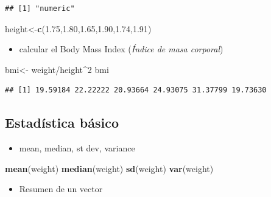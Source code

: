 \documentclass[]{article}
\def\tightlist{}
\newenvironment{Shaded}{\begin{snugshade}}{\end{snugshade}}
\newcommand{\KeywordTok}[1]{\textcolor[rgb]{0.13,0.29,0.53}{\textbf{{#1}}}}
\newcommand{\DecValTok}[1]{\textcolor[rgb]{0.00,0.00,0.81}{{#1}}}
\newcommand{\FloatTok}[1]{\textcolor[rgb]{0.00,0.00,0.81}{{#1}}}
\newcommand{\StringTok}[1]{\textcolor[rgb]{0.31,0.60,0.02}{{#1}}}
\newcommand{\NormalTok}[1]{{#1}}
\numberwithin{equation}{section}
\begin{document}
\begin{verbatim}
## [1] "numeric"
\end{verbatim}

\begin{Shaded}
\begin{Highlighting}[]
\NormalTok{height<-}\KeywordTok{c}\NormalTok{(}\FloatTok{1.75}\NormalTok{,}\FloatTok{1.80}\NormalTok{,}\FloatTok{1.65}\NormalTok{,}\FloatTok{1.90}\NormalTok{,}\FloatTok{1.74}\NormalTok{,}\FloatTok{1.91}\NormalTok{)}
\end{Highlighting}
\end{Shaded}

\begin{itemize}
\tightlist
\item
  calcular el Body Mass Index (\emph{Índice de masa corporal})
\end{itemize}

\begin{Shaded}
\begin{Highlighting}[]
\NormalTok{bmi<-}\StringTok{ }\NormalTok{weight/height^}\DecValTok{2}
\NormalTok{bmi}
\end{Highlighting}
\end{Shaded}

\begin{verbatim}
## [1] 19.59184 22.22222 20.93664 24.93075 31.37799 19.73630
\end{verbatim}

\subsection{Estadística básico}\label{estadistica-basico}

\begin{itemize}
\tightlist
\item
  mean, median, st dev, variance
\end{itemize}

\begin{Shaded}
\begin{Highlighting}[]
\KeywordTok{mean}\NormalTok{(weight) }
\KeywordTok{median}\NormalTok{(weight)}
\KeywordTok{sd}\NormalTok{(weight)}
\KeywordTok{var}\NormalTok{(weight)}
\end{Highlighting}
\end{Shaded}

\begin{itemize}
\tightlist
\item
  Resumen de un vector
\end{itemize}
\end{document}
